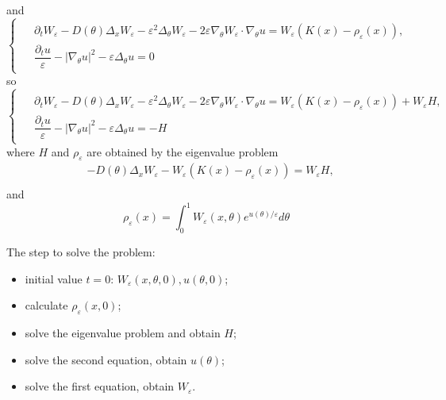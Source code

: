 \documentclass[preprint]{elsarticle}
\numberwithin{equation}{section}
\begin{document}
and
\begin{equation}
\begin{cases}
\begin{aligned}
&\partial_t W_\varepsilon-D(\theta)\Delta_x W_\varepsilon -\varepsilon^2\Delta_\theta W_\varepsilon - 2\varepsilon\nabla_\theta W_\varepsilon\cdot \nabla_\theta u = W_\varepsilon (K(x)-\rho_\varepsilon(x)),\\
& \dfrac{\partial_t u}{\varepsilon} - |\nabla_\theta u|^2 - \varepsilon \Delta_\theta u=0
\end{aligned}
\end{cases}
\end{equation}
so
\begin{equation}
\begin{cases}
\begin{aligned}
&\partial_t W_\varepsilon-D(\theta)\Delta_x W_\varepsilon -\varepsilon^2\Delta_\theta W_\varepsilon - 2\varepsilon\nabla_\theta W_\varepsilon\cdot \nabla_\theta u = W_\varepsilon (K(x)-\rho_\varepsilon(x)) + W_\varepsilon H,\\
& \dfrac{\partial_t u}{\varepsilon} - |\nabla_\theta u|^2 - \varepsilon \Delta_\theta u= -H
\end{aligned}
\end{cases}
\end{equation}
where $H$ and $\rho_\varepsilon$ are obtained by the eigenvalue problem
\begin{equation}
\begin{aligned}
&-D(\theta)\Delta_x W_\varepsilon - W_\varepsilon (K(x)-\rho_\varepsilon(x)) = W_\varepsilon H,\\
\end{aligned}
\end{equation}
and
\begin{equation}
\rho_\varepsilon(x) = \int_0^1 W_\varepsilon(x,\theta) e^{u(\theta)/\varepsilon} d\theta
\end{equation}

The step to solve the problem:
\begin{itemize}
\item initial value $t=0$: $W_\varepsilon(x,\theta, 0), u(\theta, 0)$;

\item calculate $\rho_\varepsilon(x, 0)$;

\item solve the eigenvalue problem and obtain $H$;

\item solve the second equation, obtain $u(\theta)$;

\item solve the first equation, obtain $W_\varepsilon$.
\end{itemize}
\end{document}
